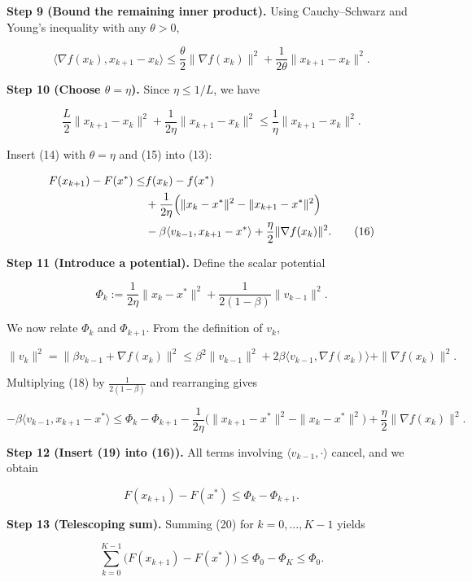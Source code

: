 \documentclass{article}
\begin{document}
\medskip
\noindent\textbf{Step 9 (Bound the remaining inner product).}  
Using Cauchy–Schwarz and Young’s inequality with any \(\theta>0\),

\[
\langle\nabla f(x_{k}),x_{k+1}-x_{k}\rangle
\le \frac{\theta}{2}\|\nabla f(x_{k})\|^{2}
+\frac{1}{2\theta}\|x_{k+1}-x_{k}\|^{2}. \tag{14}
\]

\medskip
\noindent\textbf{Step 10 (Choose \(\theta=\eta\)).}  
Since \(\eta\le 1/L\), we have  

\[
\frac{L}{2}\|x_{k+1}-x_{k}\|^{2}
+\frac{1}{2\eta}\|x_{k+1}-x_{k}\|^{2}
\le\frac{1}{\eta}\|x_{k+1}-x_{k}\|^{2}. \tag{15}
\]

Insert (14) with \(\theta=\eta\) and (15) into (13):

\[
\begin{aligned}
F(x_{k+1})-F(x^{*})\le &
f(x_{k})-f(x^{*}) \\
&+\frac{1}{2\eta}\Bigl(\|x_{k}-x^{*}\|^{2}
-\|x_{k+1}-x^{*}\|^{2}\Bigr)\\
&-\beta\langle v_{k-1},x_{k+1}-x^{*}\rangle
+\frac{\eta}{2}\|\nabla f(x_{k})\|^{2}. \tag{16}
\end{aligned}
\]

\medskip
\noindent\textbf{Step 11 (Introduce a potential).}  
Define the scalar potential  

\[
\Phi_{k}:=\frac{1}{2\eta}\|x_{k}-x^{*}\|^{2}
+\frac{1}{2(1-\beta)}\|v_{k-1}\|^{2}. \tag{17}
\]

We now relate \(\Phi_{k}\) and \(\Phi_{k+1}\).  
From the definition of \(v_{k}\),

\[
\|v_{k}\|^{2}= \|\beta v_{k-1}+ \nabla f(x_{k})\|^{2}
\le \beta^{2}\|v_{k-1}\|^{2}+2\beta\langle v_{k-1},\nabla f(x_{k})\rangle
+\|\nabla f(x_{k})\|^{2}. \tag{18}
\]

Multiplying (18) by \(\frac{1}{2(1-\beta)}\) and rearranging gives  

\[
-\beta\langle v_{k-1},x_{k+1}-x^{*}\rangle
\le \Phi_{k}-\Phi_{k+1}
-\frac{1}{2\eta}\bigl(\|x_{k+1}-x^{*}\|^{2}-\|x_{k}-x^{*}\|^{2}\bigr)
+\frac{\eta}{2}\|\nabla f(x_{k})\|^{2}. \tag{19}
\]

\medskip
\noindent\textbf{Step 12 (Insert (19) into (16)).}  
All terms involving \(\langle v_{k-1},\cdot\rangle\) cancel, and we obtain  

\[
F(x_{k+1})-F(x^{*})\le
\Phi_{k}-\Phi_{k+1}. \tag{20}
\]

\medskip
\noindent\textbf{Step 13 (Telescoping sum).}  
Summing (20) for \(k=0,\dots,K-1\) yields  

\[
\sum_{k=0}^{K-1}\bigl(F(x_{k+1})-F(x^{*})\bigr)
\le \Phi_{0}-\Phi_{K}\le\Phi_{0}. \tag{21}
\]
\end{document}
